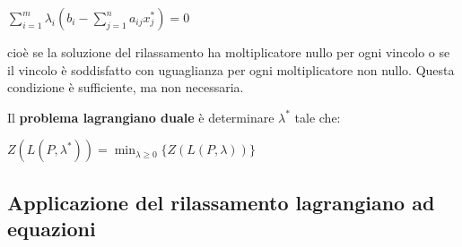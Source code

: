 \documentclass[11pt]{book}
\begin{document}
\begin{center}
$\sum\limits_{i=1}^m \lambda_i (b_i - \sum\limits_{j=1}^n a_{ij}x_j^*)
  = 0$
\end{center}

cio\`e se la soluzione del rilassamento ha moltiplicatore nullo per
ogni vincolo o se il vincolo \`e soddisfatto con uguaglianza per ogni
moltiplicatore non nullo. Questa condizione \`e sufficiente, ma non
necessaria. 

Il {\bf problema lagrangiano duale} \`e determinare $\lambda^*$ tale
che:

\begin{center}
$Z(L(P,\lambda^*)) = \min_{\lambda \geq 0} \{ Z(L(P,\lambda)) \}$  
\end{center}

\subsection{Applicazione del rilassamento lagrangiano ad equazioni}
\end{document}
